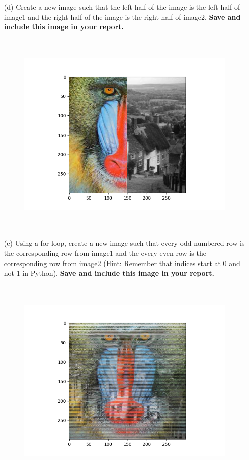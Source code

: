 \documentclass[11pt,oneside,notitlepage]{article}
\begin{document}
\begin{itemize}
	\item[(d)]
	Create a new image such that the left half of the image is the left half of
	image1 and the right half of the image is the right half of image2. \textbf{Save and include this image in your report.}
	\begin{figure}[H]
    \vspace{-0.5cm}
    \begin{center}
    \includegraphics[height=10cm]{ps0_template/p2d.png}
    \end{center}
    \end{figure}
    
	\item[(e)]
	Using a for loop, create a new image such that every odd numbered row is
	the corresponding row from image1 and the every even row is the corresponding row
	from image2 (Hint: Remember that indices start at 0 and not 1 in Python). \textbf{Save and include this image in your report.}
    \begin{figure}[H]
    \vspace{-0.4cm}
    \begin{center}
        \includegraphics[height=10cm]{ps0_template/p2e.png}
    \end{center}
    \vspace{-1.1cm}
    \end{figure}
	

\end{itemize}
\end{document}

